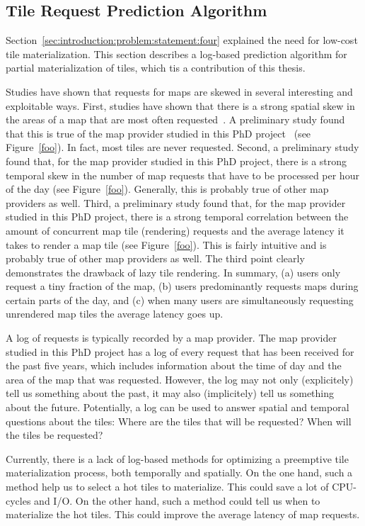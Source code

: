 \documentclass[11pt, oneside]{report}
\begin{document}
{\subsection{Tile Request Prediction Algorithm}
\label{sec:introduction:contributions:tileheat}
Section~\ref{sec:introduction:problem:statement:four} explained the need for low-cost tile materialization. This section describes a log-based prediction algorithm for partial materialization of tiles, which tis a contribution of this thesis. 

Studies have shown that requests for maps are skewed in several interesting and exploitable ways. First, studies have shown that there is a strong spatial skew in the areas of a map that are most often requested~\cite{fisher07hotmap}. A preliminary study found that this is true of the map provider studied in this PhD project~\cite{gst2014digitalmapsupply} (see Figure~\ref{foo}). In fact, most tiles are never requested. Second, a preliminary study found that, for the map provider studied in this PhD project, there is a strong temporal skew in the number of map requests that have to be processed per hour of the day (see Figure~\ref{foo}). Generally, this is probably true of other map providers as well. Third, a preliminary study found that, for the map provider studied in this PhD project, there is a strong temporal correlation between the amount of concurrent map tile (rendering) requests and the average latency it takes to render a map tile (see Figure~\ref{foo}). This is fairly intuitive and is probably true of other map providers as well. The third point clearly demonstrates the drawback of lazy tile rendering. In summary, (a) users only request a tiny fraction of the map, (b) users predominantly requests maps during certain parts of the day, and (c) when many users are simultaneously requesting unrendered map tiles the average latency goes up.

A log of requests is typically recorded by a map provider. The map provider studied in this PhD project has a log of every request that has been received for the past five years, which includes information about the time of day and the area of the map that was requested. However, the log may not only (explicitely) tell us something about the past, it may also (implicitely) tell us something about the future. Potentially, a log can be used to answer spatial and temporal questions about the tiles: Where are the tiles that will be requested? When will the tiles be requested?

Currently, there is a lack of log-based methods for optimizing a preemptive tile materialization process, both temporally and spatially. On the one hand, such a method help us to select a hot tiles to materialize. This could save a lot of CPU-cycles and I/O. On the other hand, such a method could tell us when to materialize the hot tiles. This could improve the average latency of map requests. 

}
\end{document}
